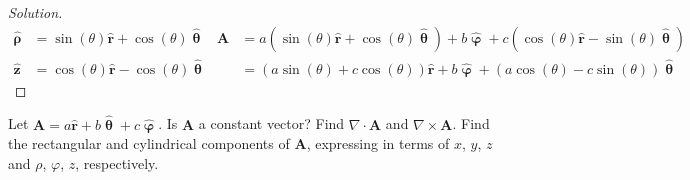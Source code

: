 \documentclass[crop=false,class=book,oneside]{standalone}
\begin{document}
\begin{proof}[Solution]
\begin{align*}
                    \hat{\boldsymbol{\uprho}}
                    &=\sin(\theta)\hat{\mathbf{r}}
                    +\cos(\theta)\hat{\boldsymbol{\uptheta}}
                    &\mathbf{A}
                    &=a(\sin(\theta)\hat{\mathbf{r}}
                    +\cos(\theta)\hat{\boldsymbol{\uptheta}})
                    +b\hat{\boldsymbol{\upvarphi}}
                    +c(\cos(\theta)\hat{\mathbf{r}}
                    -\sin(\theta)\hat{\boldsymbol{\uptheta}})\\
                    \hat{\mathbf{z}}
                    &=\cos(\theta)\hat{\mathbf{r}}
                    -\cos(\theta)\hat{\boldsymbol{\uptheta}}
                    &
                    &=(a\sin(\theta)
                    +c\cos(\theta))\hat{\mathbf{r}}
                    +b\hat{\boldsymbol{\upvarphi}}
                    +(a\cos(\theta)-c\sin(\theta))
                    \hat{\boldsymbol{\uptheta}}
                \end{align*}
            \end{proof}
            \begin{problem}[Wangsness 1-20]
                Let
                $\mathbf{A}%
                 =a\hat{\mathbf{r}}%
                 +b\hat{\boldsymbol{\uptheta}}%
                 +c\hat{\boldsymbol{\upvarphi}}$.
                Is $\mathbf{A}$ a constant vector? Find
                $\nabla\cdot\mathbf{A}$ and
                $\nabla\times\mathbf{A}$. Find the rectangular
                and cylindrical components of $\mathbf{A}$,
                expressing in terms of $x$, $y$, $z$ and
                $\rho$, $\varphi$, $z$, respectively.
            \end{problem}
\end{document}
